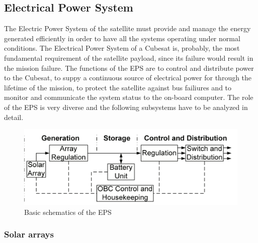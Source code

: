 \subsection{Electrical Power System}

The Electric Power System of the satellite must provide and manage the energy generated efficiently in order to have all the systems operating under normal conditions. The Electrical Power System of a Cubesat is, probably, the most fundamental requirement of the satellite payload, since its failure would result in the mission failure. The functions of the EPS are to control and distribute power to the Cubesat, to suppy a continuous source of electrical power for through the lifetime of the mission, to protect the satellite against bus failiures and to monitor and communicate the system status to the on-board computer. The role of the EPS is very diverse and the following subsystems have to be analyzed in detail.

\begin{figure}[h]
\includegraphics[scale=0.6]{./sections/SatelliteDesign/images/EPSschematics}
\centering
\caption{Basic schematics of the EPS \cite{epsbasics}}
\end{figure}

\subsubsection{Solar arrays}

